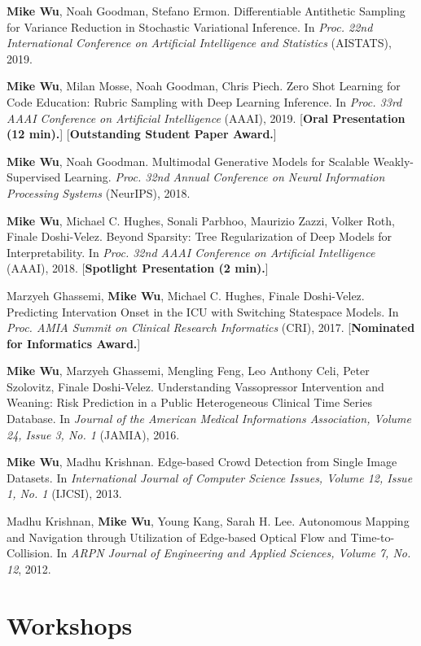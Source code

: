 \documentclass[margin, 10pt]{res} %
\begin{document}
\begin{resume}
\textbf{Mike Wu}, Noah Goodman, Stefano Ermon. Differentiable Antithetic Sampling for Variance Reduction in Stochastic Variational Inference. In \textit{Proc. 22nd International Conference on Artificial Intelligence and Statistics} (AISTATS), 2019.

\textbf{Mike Wu}, Milan Mosse, Noah Goodman, Chris Piech. Zero Shot Learning for Code Education: Rubric Sampling with Deep Learning Inference. In \textit{Proc. 33rd AAAI Conference on Artificial Intelligence} (AAAI), 2019. [\textbf{Oral Presentation (12 min).}] [\textbf{Outstanding Student Paper Award.}]

\textbf{Mike Wu}, Noah Goodman. Multimodal Generative Models for Scalable Weakly-Supervised Learning. \textit{Proc. 32nd Annual Conference on Neural Information Processing Systems} (NeurIPS), 2018.

\textbf{Mike Wu}, Michael C. Hughes, Sonali Parbhoo, Maurizio Zazzi, Volker Roth, Finale Doshi-Velez. Beyond Sparsity: Tree Regularization of Deep Models for Interpretability. In \textit{Proc. 32nd AAAI Conference on Artificial Intelligence} (AAAI), 2018. [\textbf{Spotlight Presentation (2 min).}]

Marzyeh Ghassemi, \textbf{Mike Wu}, Michael C. Hughes, Finale Doshi-Velez. Predicting Intervation Onset in the ICU with Switching Statespace Models. In \textit{Proc. AMIA Summit on Clinical Research Informatics} (CRI), 2017. [\textbf{Nominated for Informatics Award.}]

\textbf{Mike Wu}, Marzyeh Ghassemi, Mengling Feng, Leo Anthony Celi, Peter Szolovitz, Finale Doshi-Velez. Understanding Vassopressor Intervention and Weaning: Risk Prediction in a Public Heterogeneous Clinical Time Series Database. In \textit{Journal of the American Medical Informations Association, Volume 24, Issue 3, No. 1} (JAMIA), 2016.

\textbf{Mike Wu}, Madhu Krishnan. Edge-based Crowd Detection from Single Image Datasets. In \textit{International Journal of Computer Science Issues, Volume 12, Issue 1, No. 1} (IJCSI), 2013.

Madhu Krishnan, \textbf{Mike Wu}, Young Kang, Sarah H. Lee. Autonomous Mapping and Navigation through Utilization of Edge-based Optical Flow and Time-to-Collision. In \textit{ARPN Journal of Engineering and Applied Sciences, Volume 7, No. 12}, 2012.

\section{Workshops}


\end{resume}
\end{document}
